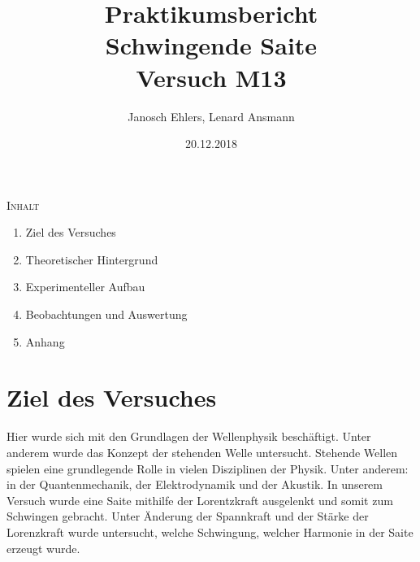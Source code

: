\documentclass[11pt, a4Paper]{article}
\begin{document}
\title{Praktikumsbericht\\Schwingende Saite\\Versuch M13}
\author{Janosch Ehlers, Lenard Ansmann}
\date{20.12.2018}
\maketitle

\begin{center}
\textsc{Inhalt}
\end{center}

\begin{enumerate}
\item Ziel des Versuches
\item Theoretischer Hintergrund
\item Experimenteller Aufbau
\item Beobachtungen und Auswertung
\item Anhang
\end{enumerate}

\newpage
\section{Ziel des Versuches}
Hier wurde sich mit den Grundlagen der Wellenphysik beschäftigt. Unter anderem wurde das Konzept der stehenden Welle untersucht. Stehende Wellen spielen eine grundlegende Rolle in vielen Disziplinen der Physik. Unter anderem: in der Quantenmechanik, der Elektrodynamik und der Akustik. In unserem Versuch wurde eine Saite mithilfe der Lorentzkraft ausgelenkt und somit zum Schwingen gebracht. Unter Änderung der Spannkraft und der Stärke der Lorenzkraft wurde untersucht, welche Schwingung, welcher Harmonie in der Saite erzeugt wurde. 
\end{document}
